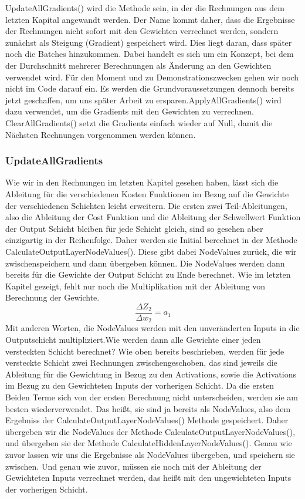 \documentclass[12pt]{article}
\begin{document}
UpdateAllGradients() wird die Methode sein, in der die Rechnungen aus dem letzten Kapital angewandt werden. Der Name kommt daher, dass die Ergebnisse der Rechnungen nicht sofort mit den Gewichten verrechnet werden, sondern zunächst als Steigung (Gradient) gespeichert wird. Dies liegt daran, dass später noch die Batches hinzukommen. Dabei handelt es sich um ein Konzept, bei dem der Durchschnitt mehrerer Berechnungen  als Änderung an den Gewichten verwendet wird. Für den Moment und zu Demonstrationszwecken gehen wir noch nicht im Code darauf ein. Es werden die Grundvoraussetzungen dennoch bereits jetzt geschaffen, um uns später Arbeit zu ersparen.ApplyAllGradients() wird dazu verwendet, um die Gradients mit den Gewichten zu verrechnen. 
ClearAllGradients() setzt die Gradients einfach wieder auf Null, damit die Nächsten Rechnungen vorgenommen werden können.\subsubsection{UpdateAllGradients}Wie wir in den Rechnungen im letzten Kapitel gesehen haben, lässt sich die Ableitung für die verschiedenen Kosten Funktionen im Bezug auf die Gewichte der verschiedenen Schichten leicht erweitern. Die ersten zwei Teil-Ableitungen, also die Ableitung der Cost Funktion und die Ableitung der Schwellwert Funktion der Output Schicht bleiben für jede Schicht gleich, sind so gesehen aber einzigartig in der Reihenfolge. Daher werden sie Initial berechnet in der Methode CalculateOutputLayerNodeValues(). Diese gibt dabei NodeValues zurück, die wir zwischenspeichern und dann übergeben können. Die NodeValues werden dann bereits für die Gewichte der Output Schicht zu Ende berechnet. Wie im letzten Kapitel gezeigt, fehlt nur noch die Multiplikation mit der Ableitung von Berechnung der Gewichte. 
$$\frac{\Delta Z_2}{\Delta w_2}=a_1$$
Mit anderen Worten, die NodeValues werden mit den unveränderten Inputs in die Outputschicht multipliziert.Wie werden dann alle Gewichte einer jeden versteckten Schicht berechnet? 
Wie oben bereits beschrieben, werden für jede versteckte Schicht zwei Rechnungen zwischengeschoben, das sind jeweils die Ableitung für die Gewichtung in Bezug zu den Activations, sowie die Activations im Bezug zu den Gewichteten Inputs der vorherigen Schicht. Da die ersten Beiden Terme sich von der ersten Berechnung nicht unterscheiden, werden sie am besten wiederverwendet. Das heißt, sie sind ja bereits als NodeValues, also dem Ergebniss der CalculateOutputLayerNodeValues() Methode gespeichert. Daher übergeben wir die NodeValues der Methode CalculateOutputLayerNodeValues(), und übergeben sie der Methode CalculateHiddenLayerNodeValues(). Genau wie zuvor lassen wir uns die Ergebnisse als NodeValues übergeben, und speichern sie zwischen. Und genau wie zuvor, müssen sie noch mit der Ableitung der Gewichteten Inputs verrechnet werden, das heißt mit den ungewichteten Inputs der vorherigen Schicht.
\end{document}

